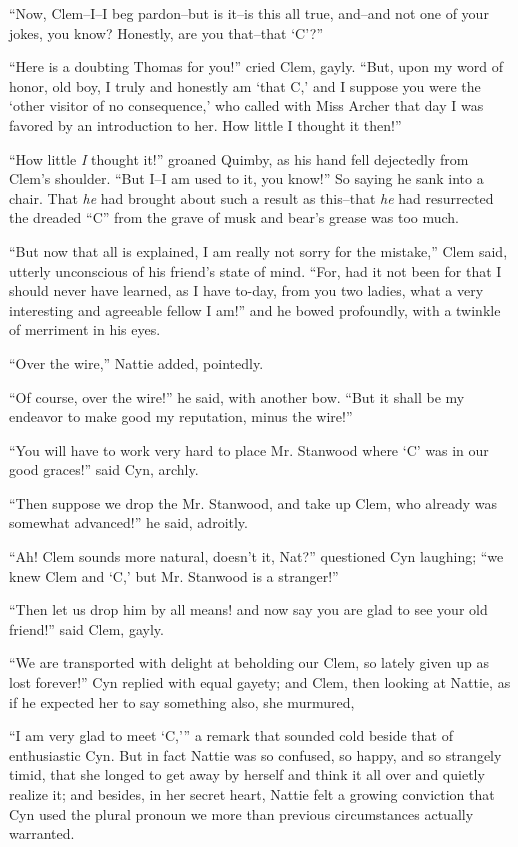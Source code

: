 ``Now, Clem--I--I beg pardon--but is it--is this all true, and--and not
one of your jokes, you know? Honestly, are you that--that `C'?''

``Here is a doubting Thomas for you!'' cried Clem, gayly. ``But, upon my
word of honor, old boy, I truly and honestly am `that C,' and I suppose
you were the `other visitor of no consequence,' who called with Miss
Archer that day I was favored by an introduction to her. How little I
thought it then!''

``How little \emph{I} thought it!'' groaned Quimby, as his hand fell dejectedly
from Clem's shoulder. ``But I--I am used to it, you know!'' So saying he
sank into a chair. That \emph{he} had brought about such a result as
this--that \emph{he} had resurrected the dreaded ``C'' from the grave of musk
and bear's grease was too much.

``But now that all is explained, I am really not sorry for the mistake,''
Clem said, utterly unconscious of his friend's state of mind. ``For, had
it not been for that I should never have learned, as I have to-day, from
you two ladies, what a very interesting and agreeable fellow I am!'' and
he bowed profoundly, with a twinkle of merriment in his eyes.

``Over the wire,'' Nattie added, pointedly.

``Of course, over the wire!'' he said, with another bow. ``But it shall be
my endeavor to make good my reputation, minus the wire!''

``You will have to work very hard to place Mr. Stanwood where `C' was in
our good graces!'' said Cyn, archly.

``Then suppose we drop the Mr. Stanwood, and take up Clem, who already
was somewhat advanced!'' he said, adroitly.

``Ah! Clem sounds more natural, doesn't it, Nat?'' questioned Cyn
laughing; ``we knew Clem and `C,' but Mr. Stanwood is a stranger!''

``Then let us drop him by all means! and now say you are glad to see your
old friend!'' said Clem, gayly.

``We are transported with delight at beholding our Clem, so lately given
up as lost forever!'' Cyn replied with equal gayety; and Clem, then
looking at Nattie, as if he expected her to say something also, she
murmured,

``I am very glad to meet `C,'{}'' a remark that sounded cold beside that of
enthusiastic Cyn. But in fact Nattie was so confused, so happy, and so
strangely timid, that she longed to get away by herself and think it all
over and quietly realize it; and besides, in her secret heart, Nattie
felt a growing conviction that Cyn used the plural pronoun we more than
previous circumstances actually warranted.

